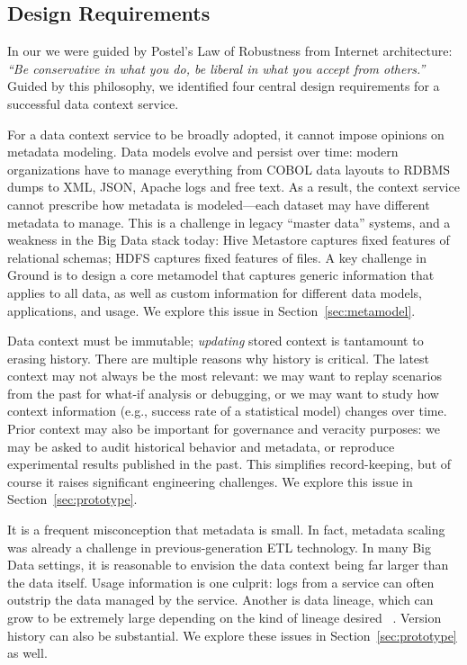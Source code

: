 \documentclass{sig-alternate}
\begin{document}
\subsection{Design Requirements}
In our we were guided by Postel's Law of Robustness from Internet architecture: \emph{``Be conservative in what you do, be liberal in what you accept from others.''}  %
Guided by this philosophy, we identified four central design requirements for a successful data context service.

 For a data context service to be broadly adopted, it cannot impose opinions on metadata modeling. 
Data models evolve and persist over time: modern organizations have to manage everything from COBOL data layouts to RDBMS dumps to XML, JSON, Apache logs and free text. 
As a result, the context service cannot 
prescribe 
how metadata is modeled---each dataset may have different metadata to manage. 
This is a challenge in legacy ``master data'' systems, and  a weakness in the Big Data stack today: Hive Metastore captures fixed features of relational schemas; HDFS captures fixed features of files.  
A key challenge in Ground is to design a core metamodel that captures generic information that applies to all data, as well as custom information for different data models, applications, and usage.
We explore this issue in Section~\ref{sec:metamodel}.

 Data context must be immutable; \emph{updating} stored context is tantamount to erasing history. %
There are multiple reasons why history is critical. 
The latest context may not always be the most relevant: we may want to replay scenarios from the past for what-if analysis or debugging, or we may want to study how context information (e.g., success rate of a statistical model) changes over time.
Prior context may also be important for governance and veracity purposes: we may be asked to audit historical behavior and metadata, or reproduce experimental results published in the past. 
This simplifies record-keeping, but of course it raises significant engineering challenges.  
We explore this issue in Section~\ref{sec:prototype}.

 It is a frequent misconception that metadata is small. In fact, metadata scaling was already a challenge in previous-generation ETL technology. In many Big Data settings, it is reasonable to envision the data context being far larger than the data itself. Usage information is one culprit:  logs from a service can often outstrip the data managed by the service. Another is data lineage, which can grow to be extremely large
depending on the kind of lineage desired
~\cite{cheney2009provenance}.  Version history can also be substantial. 
We explore these issues in Section~\ref{sec:prototype} as well.
\end{document}
